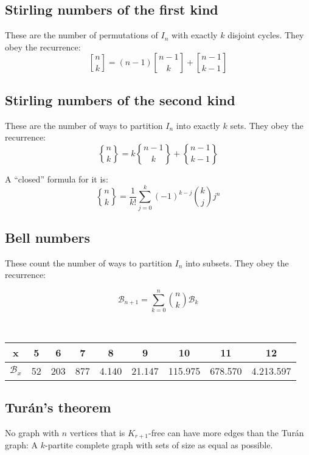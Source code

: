 \documentclass[a4paper]{amsart}
\newcommand{\stirlingfirst}[2]{\genfrac{[}{]}{0pt}{}{#1}{#2}}
\newcommand{\stirlingsecond}[2]{\genfrac{\{}{\}}{0pt}{}{#1}{#2}}
\begin{document}
\begin{multicols}{2}
    \subsection{Stirling numbers of the first kind} These are the number of permutations of $I_n$ with exactly $k$ disjoint cycles. They obey the recurrence:
      \begin{equation*}
        \stirlingfirst{n}{k} = (n-1)\stirlingfirst{n-1}{k} + \stirlingfirst{n-1}{k-1}
      \end{equation*}

    \subsection{Stirling numbers of the second kind} These are the number of ways to partition $I_n$ into exactly $k$ sets. They obey the recurrence:
      \begin{equation*}
        \stirlingsecond{n}{k} = k\stirlingsecond{n-1}{k} + \stirlingsecond{n-1}{k-1}
      \end{equation*}

      A ``closed'' formula for it is:
      \begin{equation*}
        \stirlingsecond{n}{k} = \frac{1}{k!}\sum_{j=0}^k (-1)^{k-j} \binom{k}{j} j^n
      \end{equation*}

      \subsection{Bell numbers} These count the number of ways to partition $I_n$ into subsets. They obey the recurrence:
      
      \begin{equation*}
        \mathcal{B}_{n+1} = \sum_{k=0}^n \binom{n}{k} \mathcal{B}_k
      \end{equation*}

      \

      \begin{tabular}{|c|c|c|c|c|c|c|c|c|}
        \hline
        x&5&6&7&8&9&10&11&12 \\ \hline
        $\mathcal{B}_x$&52&203&877&4.140&21.147&115.975&678.570&4.213.597 \\ \hline
      \end{tabular}


    \subsection{Turán's theorem} No graph with $n$ vertices that is $K_{r+1}$-free can have more edges than the Turán graph: A $k$-partite complete graph with sets of size as equal as possible.


\end{multicols}
\end{document}
